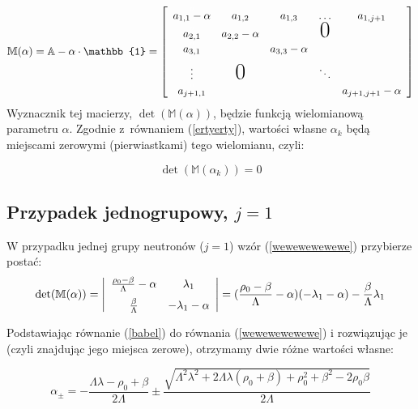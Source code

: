 	\begin{equation}
		\mathbb{M}(\alpha)= 
		\mathbb{A}-\alpha\cdot \mathbb{1}
		=
		\left[\begin{array}{ccccc}
			\uu{a_{1,1}-\alpha}&a_{1,2}&a_{1,3}&\hdots&a_{1,j+1}\\
			\uu{a_{2,1}}&a_{2,2}-\alpha&&\text{\huge0}&\\
			\uu{a_{3,1}}&&a_{3,3}-\alpha&&\\
			\uu{\vdots}&\text{\huge0}&&\ddots&\\
			\uu{a_{j+1,1}}&&&&a_{j+1,j+1}-\alpha
		\end{array}\right]
		\label{mmmmmmmmm}
	\end{equation}
	Wyznacznik tej macierzy, $\det(\mathbb{M}(\alpha))$, będzie funkcją wielomianową parametru $\alpha$. Zgodnie z~równaniem (\ref{ertyerty}), wartości własne $\alpha_k$ będą miejscami zerowymi (pierwiastkami) tego wielomianu, czyli:
	
	\begin{equation}
		\det
		(\mathbb{M}(\alpha_k)) 
		= 0
		\label{wewewewewewe}
	\end{equation}
	
	\subsection{Przypadek jednogrupowy, $j=1$}
	
	W przypadku jednej grupy neutronów ($j=1$) wzór (\ref{wewewewewewe}) przybierze postać:
	\begin{equation}
		\det(\mathbb{M}(\alpha)) =
		\left|\begin{array}{cc}
			\frac{\rho_0-\beta}{\Lambda} - \alpha&\lambda_1\\
			\uu{\frac{\beta}{\Lambda}}&-\lambda_1 - \alpha
		\end{array}\right|
		= (\frac{\rho_0-\beta}{\Lambda} - \alpha)(-\lambda_1 - \alpha) - \frac{\beta}{\Lambda}\lambda_1
		\label{babel}
	\end{equation}
	
	\noindent Podstawiając równanie (\ref{babel}) do równania (\ref{wewewewewewe}) i rozwiązując je (czyli znajdując jego miejsca zerowe), otrzymamy dwie różne wartości własne: 
	
	\begin{equation}
		\alpha_{\pm}=-\frac{\Lambda\lambda-\rho_0+\beta}{2\Lambda}\pm\frac{\sqrt{\Lambda^2\lambda^2+2\Lambda\lambda(\rho_0+\beta)+\rho_0^2+\beta^2-2\rho_0\beta}}{2\Lambda}
		\label{apm}
	\end{equation}
	
